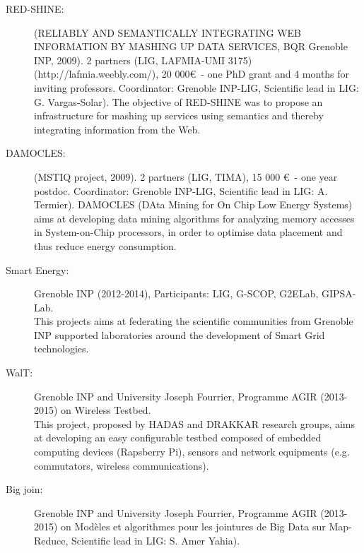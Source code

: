  \begin{description}

\item[RED-SHINE:] (RELIABLY AND SEMANTICALLY INTEGRATING WEB INFORMATION BY MASHING UP DATA SERVICES, BQR Grenoble INP, 2009). 2 partners (LIG, LAFMIA-UMI 3175)  (http://lafmia.weebly.com/), 20 000\euro\ - one PhD grant and 4 months for inviting professors. Coordinator: Grenoble INP-LIG, Scientific lead in LIG: G. Vargas-Solar). The objective of RED-SHINE was to propose an infrastructure for mashing up services using semantics and thereby integrating information from the Web. 

\item[DAMOCLES:] (MSTIQ project, 2009). 2 partners (LIG, TIMA), 15 000 \euro\ - one year postdoc. Coordinator: Grenoble INP-LIG, Scientific lead in LIG: A. Termier). DAMOCLES (DAta Mining for On Chip Low Energy Systems) aims at developing data mining algorithms for analyzing memory accesses in System-on-Chip processors, in order to optimise data placement and thus reduce energy consumption.

\item[Smart Energy:] Grenoble INP (2012-2014), Participants: LIG, G-SCOP, G2ELab, GIPSA-Lab. \\
This projects aims at federating the scientific communities from Grenoble INP supported laboratories around the development of Smart Grid technologies.

\item[WalT:] Grenoble INP and  University Joseph Fourrier, Programme AGIR (2013-2015) on Wireless Testbed. \\
This project, proposed by HADAS and DRAKKAR research groups, aims at developing an easy configurable testbed composed of embedded computing devices (Rapsberry Pi), sensors and network equipments (e.g. commutators, wireless communications). 

\item[Big join:]  Grenoble INP and  University Joseph Fourrier, Programme AGIR (2013-2015) on Mod{\`e}les et algorithmes pour les jointures de Big Data sur Map-Reduce, Scientific lead in LIG: S. Amer Yahia). 

	
\end{description}

